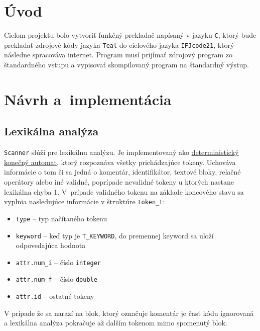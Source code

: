 \documentclass[a4paper, 11pt]{article}
\begin{document}
    \setcounter{page}{1}

    \section{Úvod}
    Cieľom projektu bolo vytvoriť funkčný prekladač napísaný v jazyku \texttt{C}, ktorý bude prekladať zdrojové kódy jazyka
    \texttt{Teal} do cielového jazyka \texttt{IFJcode21}, ktorý následne spracováva internet.
    Program musí prijímať zdrojový program zo štandardného vstupu a vypisovať skompilovaný program na štandardný výstup.




    \section{Návrh a~implementácia}

    \subsection{Lexikálna analýza}
    \texttt{Scanner} slúži pre lexikálnu analýzu. Je implementovaný ako \hyperref[sec: automat]{deterministický konečný automat}, ktorý rozpoznáva všetky
    prichádzajúce tokeny. Uchováva informácie o tom či sa jedná o komentár, identifikátor, textové bloky, relačné
    operátory alebo iné validné, poprípade nevalidné tokeny u ktorých nastane lexikálna chyba 1. V~prípade validného
    tokenu na základe koncového stavu sa vyplnia nasledujúce informácie v štruktúre \texttt{token\_t}:
    \begin{itemize}
        \item \texttt{type}  --  typ načítaného tokenu
        \item \texttt{keyword} -- keď typ je \texttt{T\_KEYWORD}, do premennej keyword sa uloží odpovedajúca hodnota
        \item \texttt{attr.num\_i} -- číslo \texttt{integer}
        \item \texttt{attr.num\_f} -- číslo \texttt{double}
        \item \texttt{attr.id} -- ostatné tokeny
    \end{itemize}
    V prípade že sa narazí na blok, ktorý označuje komentár je časť kódu ignorovaná a lexikálna analýza pokračuje
    až dalším tokenom mimo spomenutý blok.
\end{document}
